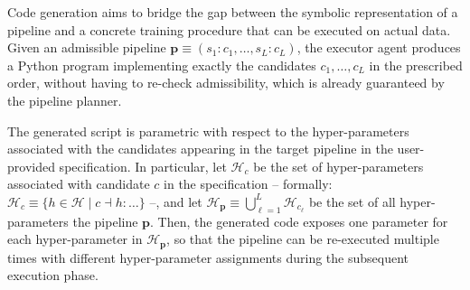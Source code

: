 \documentclass[runningheads]{llncs}
\newcommand{\sidenote}[3]{\todo[linecolor=#1,backgroundcolor=#1!25,bordercolor=#1,size=\tiny]{\textbf{#2:} #3}}
\newcommand{\malasidenote}[1]{\sidenote{violet}{Mattia}{#1}}
\begin{document}

Code generation aims to bridge the gap between the symbolic representation of a pipeline
and a concrete training procedure that can be executed on actual data.
%
Given an admissible pipeline
$
  \mathbf{p} \equiv (s_1 : c_1, \ldots, s_L : c_L)
$,
the executor agent produces a Python program implementing exactly the candidates
$c_1, \ldots, c_L$ in the prescribed order,
without having to re-check admissibility,
which is already guaranteed by the pipeline planner.

The generated script is parametric with respect to the hyper-parameters
associated with the candidates appearing in the target pipeline in the user-provided specification.
%
In particular,
let $\mathcal{H}_c$ be the set of hyper-parameters associated with candidate $c$ in the specification
-- formally: $\mathcal{H}_c \equiv \{ h \in \mathcal{H} \mid c \dashv h : \ldots \}$ --,
and let $\mathcal{H}_\mathbf{p} \equiv \bigcup_{\ell=1}^L \mathcal{H}_{c_\ell}$ be the set of all hyper-parameters the pipeline $\mathbf{p}$.
%
Then,
the generated code exposes one parameter for each hyper-parameter in $\mathcal{H}_\mathbf{p}$,
so that the pipeline can be re-executed multiple times with different hyper-parameter assignments during the subsequent execution phase.


%
%
\end{document}
